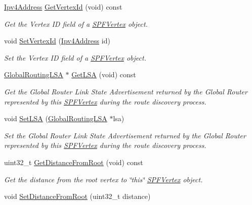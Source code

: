 \begin{DoxyCompactItemize}
\hyperlink{classns3_1_1Ipv4Address}{Ipv4\+Address} \hyperlink{classns3_1_1SPFVertex_addc1067d86f26e9fe3b2e34ed16f929c}{Get\+Vertex\+Id} (void) const 
\begin{DoxyCompactList}\small\item\em Get the Vertex ID field of a \hyperlink{classns3_1_1SPFVertex}{S\+P\+F\+Vertex} object. \end{DoxyCompactList}\item 
void \hyperlink{classns3_1_1SPFVertex_a18affd209a36365e91625959dc4583e5}{Set\+Vertex\+Id} (\hyperlink{classns3_1_1Ipv4Address}{Ipv4\+Address} id)
\begin{DoxyCompactList}\small\item\em Set the Vertex ID field of a \hyperlink{classns3_1_1SPFVertex}{S\+P\+F\+Vertex} object. \end{DoxyCompactList}\item 
\hyperlink{classns3_1_1GlobalRoutingLSA}{Global\+Routing\+L\+SA} $\ast$ \hyperlink{classns3_1_1SPFVertex_a63289ebb22ed326ec7a3813dda4b2e34}{Get\+L\+SA} (void) const 
\begin{DoxyCompactList}\small\item\em Get the Global Router Link State Advertisement returned by the Global Router represented by this \hyperlink{classns3_1_1SPFVertex}{S\+P\+F\+Vertex} during the route discovery process. \end{DoxyCompactList}\item 
void \hyperlink{classns3_1_1SPFVertex_aa391eff17a29dc444861b225d066643a}{Set\+L\+SA} (\hyperlink{classns3_1_1GlobalRoutingLSA}{Global\+Routing\+L\+SA} $\ast$lsa)
\begin{DoxyCompactList}\small\item\em Set the Global Router Link State Advertisement returned by the Global Router represented by this \hyperlink{classns3_1_1SPFVertex}{S\+P\+F\+Vertex} during the route discovery process. \end{DoxyCompactList}\item 
uint32\+\_\+t \hyperlink{classns3_1_1SPFVertex_a6fdb9c8cd6fd2dcd974136dff1bae1f0}{Get\+Distance\+From\+Root} (void) const 
\begin{DoxyCompactList}\small\item\em Get the distance from the root vertex to \char`\"{}this\char`\"{} \hyperlink{classns3_1_1SPFVertex}{S\+P\+F\+Vertex} object. \end{DoxyCompactList}\item 
void \hyperlink{classns3_1_1SPFVertex_a30885442cd0d8f7ae0e4690373b2c50a}{Set\+Distance\+From\+Root} (uint32\+\_\+t distance)

\end{DoxyCompactItemize}
